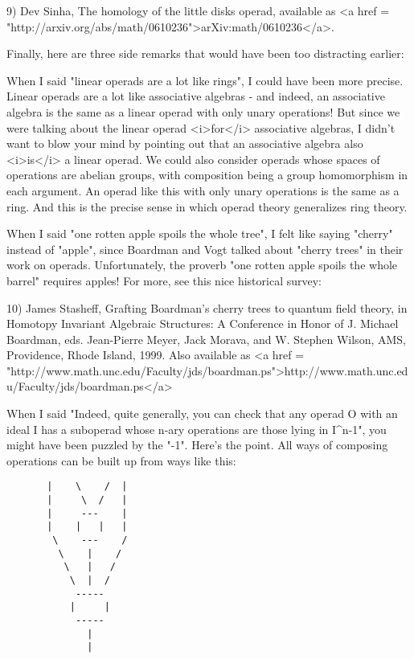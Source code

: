 9) Dev Sinha, The homology of the little disks operad, available as 
<a href = "http://arxiv.org/abs/math/0610236">arXiv:math/0610236</a>.

Finally, here are three side remarks that would have been too
distracting earlier:

When I said "linear operads are a lot like rings", I could have
been more precise.  Linear operads are a lot like associative algebras -
and indeed, an associative algebra is the same as a linear operad with
only unary operations!  But since we were talking about the linear
operad <i>for</i> associative algebras, I didn't want to blow your mind by
pointing out that an associative algebra also <i>is</i> a linear operad.
We could also consider operads whose spaces of operations are abelian
groups, with composition being a group homomorphism in each
argument.  An operad like this with only unary operations is the 
same as a ring.  And this is the precise sense in which operad theory
generalizes ring theory.

When I said "one rotten apple spoils the whole tree", I felt
like saying "cherry" instead of "apple", since
Boardman and Vogt talked about "cherry trees" in their work
on operads.  Unfortunately, the proverb "one rotten apple spoils
the whole barrel" requires apples!  For more, see this nice
historical survey:

10) James Stasheff, Grafting Boardman's cherry trees to quantum field
theory, in Homotopy Invariant Algebraic Structures: A Conference in
Honor of J. Michael Boardman, eds. Jean-Pierre Meyer, Jack
Morava, and W. Stephen Wilson, AMS, Providence, Rhode Island, 1999.
Also available as <a href = "http://www.math.unc.edu/Faculty/jds/boardman.ps">http://www.math.unc.edu/Faculty/jds/boardman.ps</a>

When I said "Indeed, quite generally, you can check that any operad O
with an ideal I has a suboperad whose n-ary operations are those lying
in I^{n-1}", you might have been puzzled by the "-1".  Here's the
point.  All ways of composing operations can be built up from ways like
this:

\begin{verbatim}
       |    \    /  |
       |     \  /   |
       |     ---    |
       |    |   |   | 
        \    ---    /
         \    |    /
          \   |   /  
           \  |  / 
            ----- 
           |     |  
            -----  
              |   
              |  
\end{verbatim}
    

